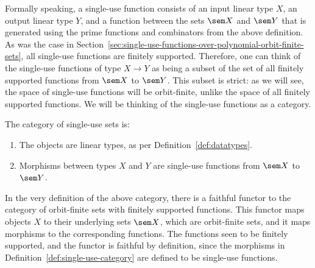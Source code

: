    


Formally speaking, a single-use function consists of an input linear type $X$, an output linear type $Y$, and a function between the sets $\sem X$ and $\sem Y$ that is generated using the prime functions and combinators from the above definition.  As was the case in Section~\ref{sec:single-use-functions-over-polynomial-orbit-finite-sets}, all single-use functions are  finitely supported.  Therefore, one can think of the single-use functions of type $X \to Y$ as being a subset of the set of all finitely supported functions from $\sem X$ to $\sem Y$. This subset is strict: as we will see, the space of single-use functions will be orbit-finite, unlike the space of all finitely supported functions. We will be thinking of the single-use functions as a category.




\begin{definition}\label{def:single-use-category}
    The category of single-use sets is:
    \begin{enumerate}
        \item The objects are linear types, as per Definition~\ref{def:datatypes}.
        \item Morphisms between types $X$ and $Y$ are single-use functions from $\sem X$ to $\sem Y$.
    \end{enumerate}
\end{definition}

In the very definition of the above category, there is a faithful functor to the category of  orbit-finite sets with finitely supported functions. This functor maps objects $X$ to their underlying sets $\sem X$, which are orbit-finite sets, and it maps morphisms to the corresponding functions. The functions seen to be finitely supported, and the functor is faithful  by definition, since the morphisms in Definition~\ref{def:single-use-category} are defined to be single-use functions. 






